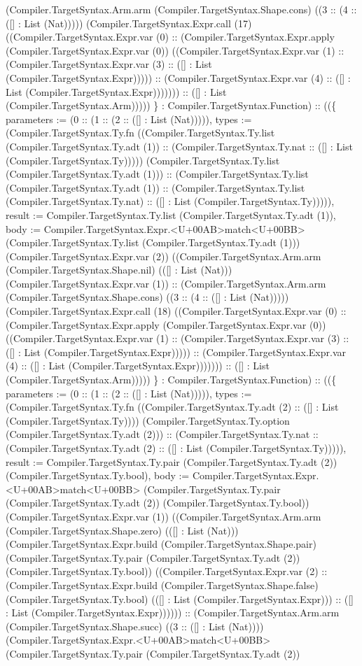 \documentclass[11pt]{article}
\begin{document}
(Compiler.TargetSyntax.Arm.arm (Compiler.TargetSyntax.Shape.cons) ((3 :: (4 :: ([] : List (Nat))))) (Compiler.TargetSyntax.Expr.call (17) ((Compiler.TargetSyntax.Expr.var (0) :: (Compiler.TargetSyntax.Expr.apply (Compiler.TargetSyntax.Expr.var (0)) ((Compiler.TargetSyntax.Expr.var (1) :: (Compiler.TargetSyntax.Expr.var (3) :: ([] : List (Compiler.TargetSyntax.Expr))))) :: (Compiler.TargetSyntax.Expr.var (4) :: ([] : List (Compiler.TargetSyntax.Expr))))))) :: ([] : List (Compiler.TargetSyntax.Arm))))) \} : Compiler.TargetSyntax.Function) :: ((\{ parameters := (0 :: (1 :: (2 :: ([] : List (Nat))))), types := (Compiler.TargetSyntax.Ty.fn ((Compiler.TargetSyntax.Ty.list (Compiler.TargetSyntax.Ty.adt (1)) :: (Compiler.TargetSyntax.Ty.nat :: ([] : List (Compiler.TargetSyntax.Ty))))) (Compiler.TargetSyntax.Ty.list (Compiler.TargetSyntax.Ty.adt (1))) :: (Compiler.TargetSyntax.Ty.list (Compiler.TargetSyntax.Ty.adt (1)) :: (Compiler.TargetSyntax.Ty.list (Compiler.TargetSyntax.Ty.nat) :: ([] : List (Compiler.TargetSyntax.Ty))))), result := Compiler.TargetSyntax.Ty.list (Compiler.TargetSyntax.Ty.adt (1)), body := Compiler.TargetSyntax.Expr.<U+00AB>match<U+00BB> (Compiler.TargetSyntax.Ty.list (Compiler.TargetSyntax.Ty.adt (1))) (Compiler.TargetSyntax.Expr.var (2)) ((Compiler.TargetSyntax.Arm.arm (Compiler.TargetSyntax.Shape.nil) (([] : List (Nat))) (Compiler.TargetSyntax.Expr.var (1)) :: (Compiler.TargetSyntax.Arm.arm (Compiler.TargetSyntax.Shape.cons) ((3 :: (4 :: ([] : List (Nat))))) (Compiler.TargetSyntax.Expr.call (18) ((Compiler.TargetSyntax.Expr.var (0) :: (Compiler.TargetSyntax.Expr.apply (Compiler.TargetSyntax.Expr.var (0)) ((Compiler.TargetSyntax.Expr.var (1) :: (Compiler.TargetSyntax.Expr.var (3) :: ([] : List (Compiler.TargetSyntax.Expr))))) :: (Compiler.TargetSyntax.Expr.var (4) :: ([] : List (Compiler.TargetSyntax.Expr))))))) :: ([] : List (Compiler.TargetSyntax.Arm))))) \} : Compiler.TargetSyntax.Function) :: ((\{ parameters := (0 :: (1 :: (2 :: ([] : List (Nat))))), types := (Compiler.TargetSyntax.Ty.fn ((Compiler.TargetSyntax.Ty.adt (2) :: ([] : List (Compiler.TargetSyntax.Ty)))) (Compiler.TargetSyntax.Ty.option (Compiler.TargetSyntax.Ty.adt (2))) :: (Compiler.TargetSyntax.Ty.nat :: (Compiler.TargetSyntax.Ty.adt (2) :: ([] : List (Compiler.TargetSyntax.Ty))))), result := Compiler.TargetSyntax.Ty.pair (Compiler.TargetSyntax.Ty.adt (2)) (Compiler.TargetSyntax.Ty.bool), body := Compiler.TargetSyntax.Expr.<U+00AB>match<U+00BB> (Compiler.TargetSyntax.Ty.pair (Compiler.TargetSyntax.Ty.adt (2)) (Compiler.TargetSyntax.Ty.bool)) (Compiler.TargetSyntax.Expr.var (1)) ((Compiler.TargetSyntax.Arm.arm (Compiler.TargetSyntax.Shape.zero) (([] : List (Nat))) (Compiler.TargetSyntax.Expr.build (Compiler.TargetSyntax.Shape.pair) (Compiler.TargetSyntax.Ty.pair (Compiler.TargetSyntax.Ty.adt (2)) (Compiler.TargetSyntax.Ty.bool)) ((Compiler.TargetSyntax.Expr.var (2) :: (Compiler.TargetSyntax.Expr.build (Compiler.TargetSyntax.Shape.false) (Compiler.TargetSyntax.Ty.bool) (([] : List (Compiler.TargetSyntax.Expr))) :: ([] : List (Compiler.TargetSyntax.Expr)))))) :: (Compiler.TargetSyntax.Arm.arm (Compiler.TargetSyntax.Shape.succ) ((3 :: ([] : List (Nat)))) (Compiler.TargetSyntax.Expr.<U+00AB>match<U+00BB> (Compiler.TargetSyntax.Ty.pair (Compiler.TargetSyntax.Ty.adt (2)) 
\end{document}
